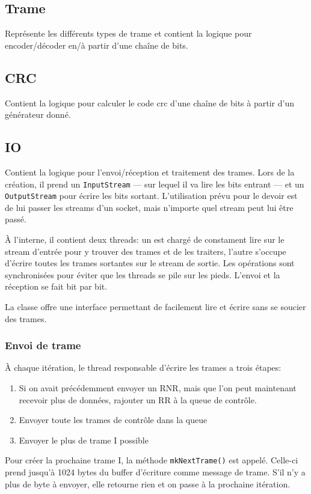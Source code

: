 \documentclass{article}
\begin{document}
    \subsection{Trame}
    Représente les différents types de trame et contient la logique pour encoder/décoder en/à partir d'une chaîne de bits.
    
    \subsection{CRC}
    Contient la logique pour calculer le code crc d'une chaîne de bits à partir d'un générateur donné.
    
    \subsection{IO}
    Contient la logique pour l'envoi/réception et traitement des trames.
    Lors de la création, il prend un \verb#InputStream# --- sur lequel il va lire les bits entrant --- et un \verb#OutputStream# pour écrire les bits sortant. L'utilisation prévu pour le devoir est de lui passer les streams d'un socket, mais n'importe quel stream peut lui être passé.

    À l'interne, il contient deux threads: un est chargé de constament lire sur le stream d'entrée pour y trouver des trames et de les traiters, l'autre s'occupe d'écrire toutes les trames sortantes sur le stream de sortie. Les opérations sont synchronisées pour éviter que les threads se pile sur les pieds. L'envoi et la réception se fait bit par bit.

    La classe offre une interface permettant de facilement lire et écrire sans se soucier des trames.

    \subsubsection{Envoi de trame}
    À chaque itération, le thread responsable d'écrire les trames a trois étapes:
    \begin{enumerate}
        \item Si on avait précédemment envoyer un RNR, mais que l'on peut maintenant recevoir plus de données, rajouter un RR à la queue de contrôle.
        \item Envoyer toute les trames de contrôle dans la queue
        \item Envoyer le plus de trame I possible
    \end{enumerate}
    Pour créer la prochaine trame I, la méthode \verb#mkNextTrame()# est appelé. Celle-ci prend jusqu'à 1024 bytes du buffer d'écriture comme message de trame. S'il n'y a plus de byte à envoyer, elle retourne rien et on passe à la prochaine itération.
\end{document}
